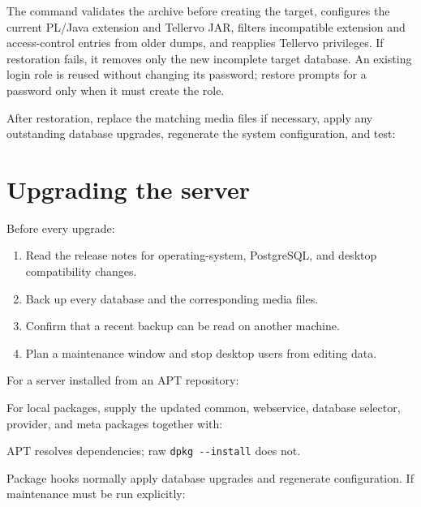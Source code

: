 The command validates the archive before creating the target, configures the
current PL/Java extension and Tellervo JAR, filters incompatible extension and
access-control entries from older dumps, and reapplies Tellervo privileges. If
restoration fails, it removes only the new incomplete target database. An
existing login role is reused without changing its password; restore prompts
for a password only when it must create the role.

After restoration, replace the matching media files if necessary, apply any
outstanding database upgrades, regenerate the system configuration, and test:


\section{Upgrading the server}
\label{txt:upgradeserver}

Before every upgrade:

\begin{enumerate}
 \item Read the release notes for operating-system, PostgreSQL, and desktop
 compatibility changes.
 \item Back up every database and the corresponding media files.
 \item Confirm that a recent backup can be read on another machine.
 \item Plan a maintenance window and stop desktop users from editing data.
\end{enumerate}

For a server installed from an APT repository:


For local packages, supply the updated common, webservice, database selector,
provider, and meta packages together with:


APT resolves dependencies; raw \verb|dpkg --install| does not.

Package hooks normally apply database upgrades and regenerate configuration.
If maintenance must be run explicitly:


